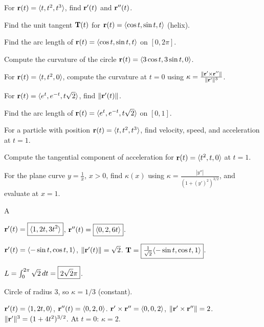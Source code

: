 \documentclass[11pt]{article}
\begin{document}
\begin{problems}
\item For $\mathbf{r}(t) = \langle t, t^2, t^3 \rangle$, find $\mathbf{r}'(t)$ and $\mathbf{r}''(t)$.
\item Find the unit tangent $\mathbf{T}(t)$ for $\mathbf{r}(t) = \langle \cos t, \sin t, t \rangle$ (helix).
\item Find the arc length of $\mathbf{r}(t) = \langle \cos t, \sin t, t\rangle$ on $[0, 2\pi]$.
\item Compute the curvature of the circle $\mathbf{r}(t) = \langle 3 \cos t, 3 \sin t, 0 \rangle$.
\item For $\mathbf{r}(t) = \langle t, t^2, 0\rangle$, compute the curvature at $t = 0$ using $\kappa = \tfrac{\|\mathbf{r}'\times\mathbf{r}''\|}{\|\mathbf{r}'\|^3}$.
\end{problems}

\vfill
\newpage
{}
\begin{problems}
\item For $\mathbf{r}(t) = \langle e^t, e^{-t}, t\sqrt 2 \rangle$, find $\|\mathbf{r}'(t)\|$.
\item Find the arc length of $\mathbf{r}(t) = \langle e^t, e^{-t}, t\sqrt 2\rangle$ on $[0, 1]$.
\item For a particle with position $\mathbf{r}(t) = \langle t, t^2, t^3\rangle$, find velocity, speed, and acceleration at $t=1$.
\item Compute the tangential component of acceleration for $\mathbf{r}(t) = \langle t^2, t, 0\rangle$ at $t = 1$.
\item For the plane curve $y = \tfrac{1}{x}$, $x > 0$, find $\kappa(x)$ using $\kappa = \tfrac{|y''|}{(1+(y')^2)^{3/2}}$, and evaluate at $x = 1$.
\end{problems}

\vfill
\newpage
{}

\begin{answers}{A}
\item $\mathbf{r}'(t) = \boxed{\langle 1, 2t, 3t^2 \rangle}$, $\mathbf{r}''(t) = \boxed{\langle 0, 2, 6t \rangle}$.
\item $\mathbf{r}'(t) = \langle -\sin t, \cos t, 1\rangle$, $\|\mathbf{r}'(t)\| = \sqrt 2$. $\mathbf{T} = \boxed{\tfrac{1}{\sqrt 2}\langle -\sin t, \cos t, 1\rangle}$.
\item $L = \int_0^{2\pi} \sqrt 2 \,dt = \boxed{2\sqrt 2 \pi}$.
\item Circle of radius $3$, so $\kappa = \boxed{1/3}$ (constant).
\item $\mathbf{r}'(t) = \langle 1, 2t, 0\rangle$, $\mathbf{r}''(t) = \langle 0, 2, 0\rangle$. $\mathbf{r}'\times\mathbf{r}'' = \langle 0, 0, 2\rangle$, $\|\mathbf{r}'\times\mathbf{r}''\| = 2$. $\|\mathbf{r}'\|^3 = (1+4t^2)^{3/2}$. At $t = 0$: $\kappa = \boxed{2}$.
\end{answers}
\end{document}
